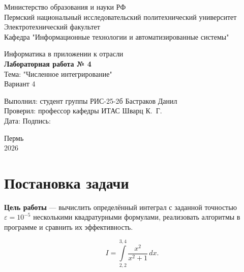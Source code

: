 \documentclass[14pt,a4paper]{extarticle}
\begin{document}
\begin{titlepage}
    \centering
    \large
    Министерство образования и науки РФ\\[0.3cm]
    Пермский национальный исследовательский политехнический университет\\[0.3cm]
    Электротехнический факультет\\[0.3cm]
    Кафедра "Информационные технологии и автоматизированные системы"

    \vspace{3.5cm}
    {\Large Информатика в приложении к отрасли}\\[0.4cm]
    {\Large\bfseries Лабораторная работа № 4}\\[0.6cm]

    Тема: "Численное интегрирование"\\[0.2cm]
    Вариант 4

    \vspace{4.5cm}
    \begin{flushleft}
        \large
        Выполнил: студент группы РИС-25-2б \hfill Бастраков Данил\\[0.5cm]
        Проверил: профессор кафедры ИТАС \hfill Шварц К.~Г.\\[0.5cm]
        Дата: \underline{\hspace{3cm}} \hfill Подпись: \underline{\hspace{4cm}}
    \end{flushleft}

    \vfill
    Пермь\\ 2026
\end{titlepage}

\tableofcontents
\newpage

\section{Постановка задачи}

\textbf{Цель работы} --- вычислить определённый интеграл с заданной
точностью $\varepsilon=10^{-5}$ несколькими квадратурными формулами,
реализовать алгоритмы в программе и сравнить их эффективность.

\begin{equation}
    I=\int\limits_{2,2}^{3,4}\frac{x^2}{x^2+1}\,dx .
    \label{eq:integral}
\end{equation}
\end{document}
